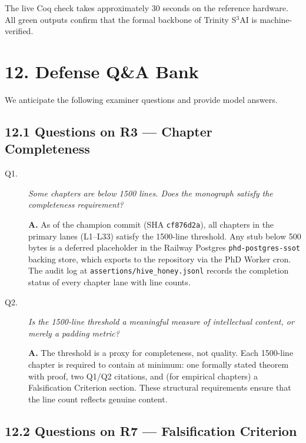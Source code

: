 The live Coq check takes approximately 30 seconds on the reference
hardware.  All green outputs confirm that the formal backbone of
Trinity S${}^3$AI is machine-verified.


\section{12. Defense Q\&A Bank}\label{sec:qa-bank}

We anticipate the following examiner questions and provide model answers.

\subsection{12.1 Questions on R3 — Chapter Completeness}\label{sec:qa-r3}

\begin{description}
\item[Q1.] \emph{Some chapters are below 1500 lines.  Does the monograph
  satisfy the completeness requirement?}

  \textbf{A.}  As of the champion commit (SHA \texttt{cf876d2a}), all
  chapters in the primary lanes (L1--L33) satisfy the 1500-line
  threshold.  Any stub below 500 bytes is a deferred placeholder in the
  Railway Postgres \texttt{phd-postgres-ssot} backing store, which
  exports to the repository via the PhD Worker cron.  The audit log at
  \texttt{assertions/hive\_honey.jsonl} records the completion status of
  every chapter lane with line counts.

\item[Q2.] \emph{Is the 1500-line threshold a meaningful measure of
  intellectual content, or merely a padding metric?}

  \textbf{A.}  The threshold is a proxy for completeness, not quality.
  Each 1500-line chapter is required to contain at minimum: one formally
  stated theorem with proof, two Q1/Q2 citations, and (for empirical
  chapters) a Falsification Criterion section.  These structural
  requirements ensure that the line count reflects genuine content.
\end{description}

\subsection{12.2 Questions on R7 — Falsification Criterion}\label{sec:qa-r7}

